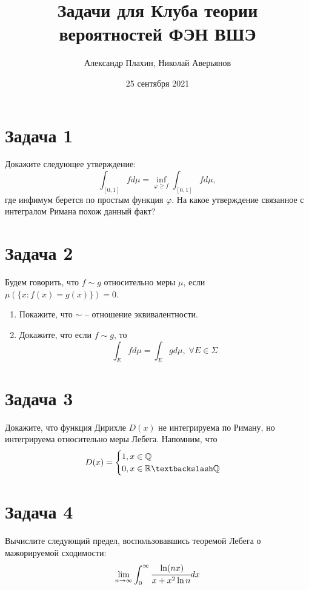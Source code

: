 \documentclass[a4paper, 12pt]{article}
\title{Задачи для Клуба теории вероятностей ФЭН ВШЭ}
\author{Александр Плахин, Николай Аверьянов}
\date{25 сентября 2021}
\newcommand{\R}{\mathbb{R}}
\begin{document}
\maketitle

\section*{Задача 1}
Докажите следующее утверждение:
$$
\int_{[0, 1]}f d\mu = \inf_{\varphi \geq f} \int_{[0, 1]} f d\mu, 
$$
где инфимум берется по простым функция $\varphi$. На какое утверждение связанное с интегралом Римана похож данный факт? 

\section*{Задача 2}
Будем говорить, что $f \sim g$ относительно меры $\mu$, если $\mu(\{x: f(x) = g(x)\}) = 0$. 
\begin{enumerate}
    \item Покажите, что $\sim$ -- отношение эквивалентности.
    \item Докажите, что если $f \sim g$, то 
    $$
    \int_E f d\mu = \int_E g d\mu, \; \forall E \in \Sigma
    $$
\end{enumerate}

\section*{Задача 3} 

Докажите, что функция Дирихле $D(x)$ не интегрируема по Риману, но интегрируема относительно меры Лебега. Напомним, что 
$$
D(x) = \begin{cases}
1, x \in \mathbb{Q} \\
0, x \in \R \textbackslash \mathbb{Q}
\end{cases}
$$

\section*{Задача 4}
Вычислите следующий предел, воспользовавшись теоремой Лебега о мажорируемой сходимости:
$$
\lim_{n \to \infty} \int_{0}^{\infty} \cfrac{\ln(nx)}{x+x^2\ln n}dx 
$$
\end{document}
